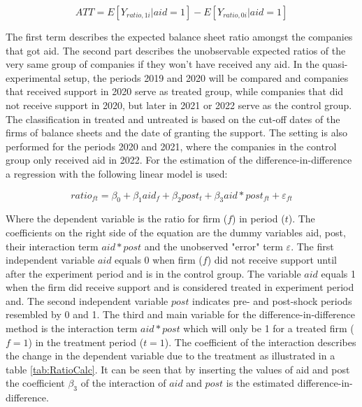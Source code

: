 \begin{equation}
    ATT = E[Y_{ratio,1i}| aid=1]-E[Y_{ratio,0i}| aid=1] 
    \label{eqn:ATT}
\end{equation}

The first term describes the expected balance sheet ratio amongst the companies that got aid. The second part describes the unobservable expected ratios of the very same group of companies if they won't have received any aid. In the quasi-experimental setup, the periods 2019 and 2020 will be compared and companies that received support in 2020 serve as treated group, while companies that did not receive support in 2020, but later in 2021 or 2022 serve as the control group. The classification in treated and untreated is based on the cut-off dates of the firms of balance sheets and the date of granting the support. The setting is also performed for the periods 2020 and 2021, where the companies in the control group only received aid in 2022. For the estimation of the difference-in-difference a regression with the following linear model is used:


\begin{equation}
    ratio_{ft} = \beta_{0} + \beta_{1}aid_{f} + \beta_{2}post_{t} + \beta_{3}aid\ast post_{ft} + \varepsilon_{ft} 
    \label{eqn:Diff&Diff}
\end{equation}

Where the dependent variable is the ratio for firm ($f$) in period ($t$). The coefficients on the right side of the equation are the dummy variables aid, post, their interaction term $ aid\ast post$ and the unobserved "error" term $ \varepsilon$. The first independent variable $aid$ equals 0 when firm ($f$) did not receive support until after the experiment period and is in the control group. The variable $aid$ equals 1 when the firm did receive support and is considered treated in experiment period and. The second independent variable $post$ indicates pre- and post-shock periods resembled by 0 and 1. The third and main variable for the difference-in-difference method is the interaction term $ aid\ast post$ which will only be 1 for a treated firm ($f=1$) in the treatment period ($t=1$). The coefficient of the interaction describes the change in the dependent variable due to the treatment as illustrated in a table \ref{tab:RatioCalc}. It can be seen that by inserting the values of aid and post the coefficient $\beta_{3}$ of the interaction of $aid$ and $post$ is the estimated difference-in-difference.

